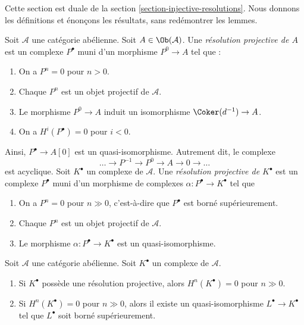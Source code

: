 \noindent
Cette section est duale de la section \ref{section-injective-resolutions}.
Nous donnons les définitions et énonçons les résultats, sans redémontrer les
lemmes.

\begin{definition}
\label{definition-projective-resolution}
Soit $\mathcal{A}$ une catégorie abélienne. Soit
$A \in \Ob(\mathcal{A})$. Une {\it résolution projective de $A$} est un
complexe $P^\bullet$ muni d'un morphisme $P^0 \to A$ tel que :
\begin{enumerate}
\item On a $P^n = 0$ pour $n > 0$.
\item Chaque $P^n$ est un objet projectif de $\mathcal{A}$.
\item Le morphisme $P^0 \to A$ induit un isomorphisme
$\Coker(d^{-1}) \to A$.
\item On a $H^i(P^\bullet) = 0$ pour $i < 0$.
\end{enumerate}
Ainsi, $P^\bullet \to A[0]$ est un quasi-isomorphisme. Autrement dit, le
complexe
$$
\ldots \to P^{-1} \to P^0 \to A \to 0 \to \ldots
$$
est acyclique. Soit $K^\bullet$ un complexe de $\mathcal{A}$. Une
{\it résolution projective de $K^\bullet$} est un complexe $P^\bullet$ muni
d'un morphisme de complexes $\alpha : P^\bullet \to K^\bullet$ tel que
\begin{enumerate}
\item On a $P^n = 0$ pour $n \gg 0$, c'est-à-dire que $P^\bullet$ est borné
supérieurement.
\item Chaque $P^n$ est un objet projectif de $\mathcal{A}$.
\item Le morphisme $\alpha : P^\bullet \to K^\bullet$ est un
quasi-isomorphisme.
\end{enumerate}
\end{definition}

\begin{lemma}
\label{lemma-cohomology-bounded-above}
Soit $\mathcal{A}$ une catégorie abélienne. Soit $K^\bullet$ un complexe de
$\mathcal{A}$.
\begin{enumerate}
\item Si $K^\bullet$ possède une résolution projective, alors
$H^n(K^\bullet) = 0$ pour $n \gg 0$.
\item Si $H^n(K^\bullet) = 0$ pour $n \gg 0$, alors il existe un
quasi-isomorphisme $L^\bullet \to K^\bullet$ tel que $L^\bullet$ soit borné
supérieurement.
\end{enumerate}
\end{lemma}

